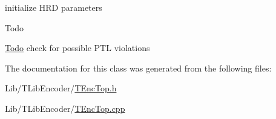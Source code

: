 initialize H\+RD parameters 

\begin{DoxyRefDesc}{Todo}
\item[\hyperlink{todo__todo000007}{Todo}]check for possible P\+TL violations \end{DoxyRefDesc}


The documentation for this class was generated from the following files\+:\begin{DoxyCompactItemize}
\item 
Lib/\+T\+Lib\+Encoder/\hyperlink{_t_enc_top_8h}{T\+Enc\+Top.\+h}\item 
Lib/\+T\+Lib\+Encoder/\hyperlink{_t_enc_top_8cpp}{T\+Enc\+Top.\+cpp}\end{DoxyCompactItemize}
